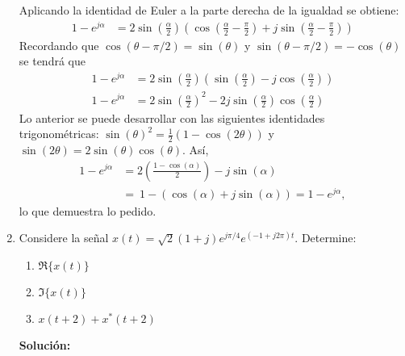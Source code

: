 \documentclass[letterpaper, 12pt]{article}
\newif\ifanswers
\begin{document}
\begin{enumerate}
{    Aplicando la identidad de Euler a la parte derecha de la igualdad se obtiene:
    \begin{align*}
        1-e^{j\alpha} &= 2\sin\left(\frac{\alpha}{2}\right)(\cos\left(\frac{\alpha}{2}-\frac{\pi}{2}\right)+j\sin\left(\frac{\alpha}{2}-\frac{\pi}{2}\right))
    \end{align*}
    Recordando que $\cos(\theta-\pi/2) = \sin(\theta)$ y $\sin(\theta-\pi/2)=-\cos(\theta)$ se tendrá que
    \begin{align*}
        1-e^{j\alpha} &= 2\sin\left(\frac{\alpha}{2}\right)(\sin\left(\frac{\alpha}{2}\right)-j\cos\left(\frac{\alpha}{2}\right)) \\
        1-e^{j\alpha} &= 2\sin\left(\frac{\alpha}{2}\right)^2-2j\sin\left(\frac{\alpha}{2}\right)\cos\left(\frac{\alpha}{2}\right)
    \end{align*}
    Lo anterior se puede desarrollar con las siguientes identidades trigonométricas: $\sin(\theta)^2=\frac{1}{2}(1-\cos(2\theta))$ y $\sin(2\theta) = 2\sin(\theta)\cos(\theta)$. Así,
    \begin{align*}
        1-e^{j\alpha} &= 2\left(\frac{1-\cos(\alpha)}{2}\right)-j\sin(\alpha) \\
        &= \ 1 - (\cos(\alpha)+j\sin(\alpha)) = 1 - e^{j\alpha},
    \end{align*}
    lo que demuestra lo pedido.}
    \fi

    \item Considere la señal $x(t) = \sqrt{2}(1+j)e^{j\pi/4}e^{(-1+j 2\pi)t} $. Determine:
    \begin{enumerate}
        \item $\Re\{x(t)\}$
        \item $\Im\{x(t)\}$ 
        \item $x(t+2)+x^{*}(t+2)$
    \end{enumerate}

    \ifanswers
    {\color{red}\textbf{Solución:}
    
}
\end{enumerate}
\end{document}
